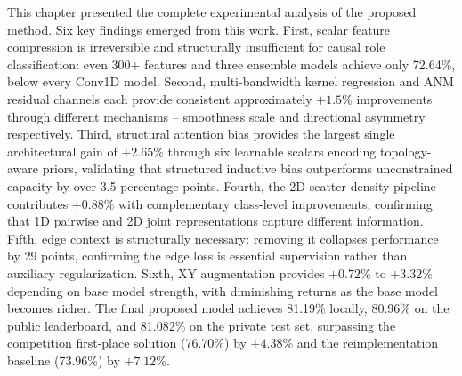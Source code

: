 This chapter presented the complete experimental analysis of the proposed method. Six key findings emerged from this work. First, scalar feature compression is irreversible and structurally insufficient for causal role classification: even 300+ features and three ensemble models achieve only 72.64\%, below every Conv1D model. Second, multi-bandwidth kernel regression and ANM residual channels each provide consistent approximately $+1.5\%$ improvements through different mechanisms -- smoothness scale and directional asymmetry respectively. Third, structural attention bias provides the largest single architectural gain of $+2.65\%$ through six learnable scalars encoding topology-aware priors, validating that structured inductive bias outperforms unconstrained capacity by over 3.5 percentage points. Fourth, the 2D scatter density pipeline contributes $+0.88\%$ with complementary class-level improvements, confirming that 1D pairwise and 2D joint representations capture different information. Fifth, edge context is structurally necessary: removing it collapses performance by 29 points, confirming the edge loss is essential supervision rather than auxiliary regularization. Sixth, XY augmentation provides $+0.72\%$ to $+3.32\%$ depending on base model strength, with diminishing returns as the base model becomes richer. The final proposed model achieves 81.19\% locally, 80.96\% on the public leaderboard, and 81.082\% on the private test set, surpassing the competition first-place solution (76.70\%) by $+4.38\%$ and the reimplementation baseline (73.96\%) by $+7.12\%$.